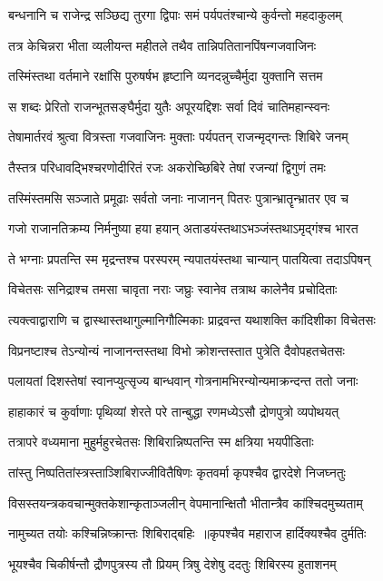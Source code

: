 \twolineshloka
{बन्धनानि च राजेन्द्र सञ्छिद्य तुरगा द्विपाः}
{समं पर्यपतंश्चान्ये कुर्वन्तो महदाकुलम्}


\twolineshloka
{तत्र केचिन्नरा भीता व्यलीयन्त महीतले}
{तथैव तान्निपतितानपिंषन्गजवाजिनः}


\twolineshloka
{तस्मिंस्तथा वर्तमाने रक्षांसि पुरुषर्षभ}
{हृष्टानि व्यनदन्नुच्चैर्मुदा युक्तानि सत्तम}


\twolineshloka
{स शब्दः प्रेरितो राजन्भूतसङ्घैर्मुदा युतैः}
{अपूरयद्दिशः सर्वा दिवं चातिमहान्स्वनः}


\twolineshloka
{तेषामार्तरवं श्रुत्वा वित्रस्ता गजवाजिनः}
{मुक्ताः पर्यपतन् राजन्मृद्गन्तः शिबिरे जनम्}


\twolineshloka
{तैस्तत्र परिधावद्भिश्चरणोदीरितं रजः}
{अकरोच्छिबिरे तेषां रजन्यां द्विगुणं तमः}


\twolineshloka
{तस्मिंस्तमसि सञ्जाते प्रमूढाः सर्वतो जनाः}
{नाजानन् पितरः पुत्रान्भ्रातॄन्भ्रातर एव च}


\twolineshloka
{गजो राजानतिक्रम्य निर्मनुष्या हया हयान्}
{अताडयंस्तथाऽभञ्जंस्तथाऽमृद्गंश्च भारत}


\twolineshloka
{ते भग्नाः प्रपतन्ति स्म मृद्रन्तश्च परस्परम्}
{न्यपातयंस्तथा चान्यान् पातयित्वा तदाऽपिषन्}


\twolineshloka
{विचेतसः सनिद्राश्च तमसा चावृता नराः}
{जघ्रुः स्वानेव तत्राथ कालेनैव प्रचोदिताः}


\twolineshloka
{त्यक्त्वाद्वाराणि च द्वास्थास्तथागुल्मानिगौल्मिकाः}
{प्राद्रवन्त यथाशक्ति कांदिशीका विचेतसः}


\twolineshloka
{विप्रनष्टाश्च तेऽन्योन्यं नाजानन्तस्तथा विभो}
{क्रोशन्तस्तात पुत्रेति दैवोपहतचेतसः}


\twolineshloka
{पलायतां दिशस्तेषां स्वानप्युत्सृज्य बान्धवान्}
{गोत्रनामभिरन्योन्यमाक्रन्दन्त ततो जनाः}


\twolineshloka
{हाहाकारं च कुर्वाणाः पृथिव्यां शेरते परे}
{तान्बुद्धा रणमध्येऽसौ द्रोणपुत्रो व्यपोथयत्}


\twolineshloka
{तत्रापरे वध्यमाना मुहुर्महुरचेतसः}
{शिबिरान्निष्पतन्ति स्म क्षत्रिया भयपीडिताः}


\twolineshloka
{तांस्तु निष्पतितांस्त्रस्ताञ्शिबिराज्जीवितैषिणः}
{कृतवर्मा कृपश्चैव द्वारदेशे निजघ्नतुः}


\twolineshloka
{विसस्तयन्त्रकवचान्मुक्तकेशान्कृताञ्जलीन्}
{वेपमानान्क्षितौ भीतान्त्रैव कांश्चिदमुच्यताम्}


\twolineshloka
{नामुच्यत तयोः कश्चिन्निष्क्रान्तः शिबिराद्बहिः ॥कृपश्चैव महाराज हार्दिक्यश्चैव दुर्मतिः}
{}


\twolineshloka
{भूयश्चैव चिकीर्षन्तौ द्रौणपुत्रस्य तौ प्रियम्}
{त्रिषु देशेषु ददतुः शिबिरस्य हुताशनम्}


